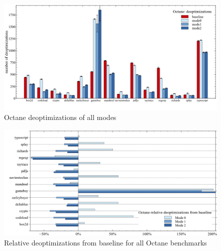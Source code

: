\begin{figure}[ht]
  \begin{center}
    \centering
    \includegraphics[width=1.0\textwidth]{figures/octane_deopt.png}
    \caption{Octane deoptimizations of all modes} 
    \label{f:octane_deopt}
  \end{center}
\end{figure}
\begin{figure}[ht]
  \begin{center}
    \centering
    \includegraphics[width=1.0\textwidth]{figures/octane_variation_deopt.png}
    \caption{Relative deoptimizations from baseline for all Octane benchmarks}
    \label{f:octane_variation_deopt}
  \end{center}
\end{figure}
\clearpage
